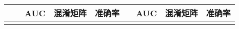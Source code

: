 \begin{landscape}
\begin{longtable}{m{3cm}<{\centering}m{5cm}<{\centering}m{1cm}<{\centering}m{2cm}<{\centering}m{1cm}<{\centering}m{3cm}<{\centering}m{1cm}<{\centering}m{2cm}<{\centering}m{1cm}<{\centering}}
            \multicolumn{1}{c}{} & \multicolumn{1}{c}{}     & \textbf{AUC} & \textbf{混淆矩阵}    & \textbf{准确率} & \multicolumn{1}{c}{}    & \textbf{AUC} & \multicolumn{1}{c}{\textbf{混淆矩阵}}     & \textbf{准确率} \\
            \endhead 
            \midrule
            \endfoot
            \bottomrule
            \endlastfoot

\end{longtable}
\end{landscape}
